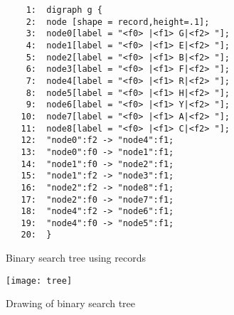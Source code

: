 \documentclass[11pt]{article}
\begin{document}
\begin{figure}[p]\footnotesize
\begin{verbatim}
    1:  digraph g {
    2:  node [shape = record,height=.1];
    3:  node0[label = "<f0> |<f1> G|<f2> "];
    4:  node1[label = "<f0> |<f1> E|<f2> "];
    5:  node2[label = "<f0> |<f1> B|<f2> "];
    6:  node3[label = "<f0> |<f1> F|<f2> "];
    7:  node4[label = "<f0> |<f1> R|<f2> "];
    8:  node5[label = "<f0> |<f1> H|<f2> "];
    9:  node6[label = "<f0> |<f1> Y|<f2> "];
   10:  node7[label = "<f0> |<f1> A|<f2> "];
   11:  node8[label = "<f0> |<f1> C|<f2> "];
   12:  "node0":f2 -> "node4":f1;
   13:  "node0":f0 -> "node1":f1;
   14:  "node1":f0 -> "node2":f1;
   15:  "node1":f2 -> "node3":f1;
   16:  "node2":f2 -> "node8":f1;
   17:  "node2":f0 -> "node7":f1;
   18:  "node4":f2 -> "node6":f1;
   19:  "node4":f0 -> "node5":f1;
   20:  }
\end{verbatim}
\caption{Binary search tree using records}
\label{fig:tree}
\end{figure}

\begin{figure}[p]
	\centerline {
		\texttt{[image: tree]}
	}
    \caption{Drawing of binary search tree}
    \label{fig:treedrawing}
\end{figure}
\end{document}

